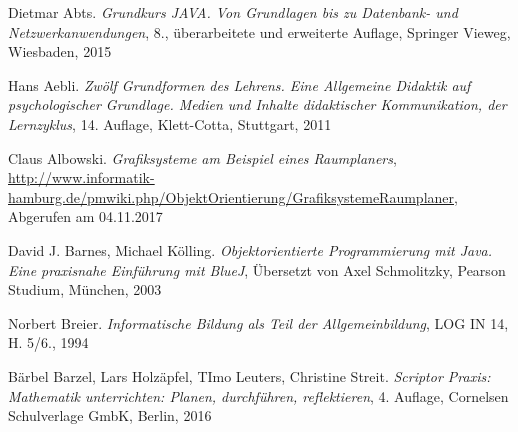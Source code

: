 \begin{thebibliography}{ABCDEF}

\renewcommand{\refname}{\normalsize Literaturverzeichnis}


Dietmar Abts. \emph{Grundkurs JAVA. Von Grundlagen bis zu Datenbank- und Netzwerkanwendungen}, 8., überarbeitete und erweiterte Auflage, Springer Vieweg, Wiesbaden, 2015

Hans Aebli. \emph{Zwölf Grundformen des Lehrens. Eine Allgemeine Didaktik auf psychologischer Grundlage. Medien und Inhalte didaktischer Kommunikation, der Lernzyklus}, 14. Auflage, Klett-Cotta, Stuttgart, 2011

Claus Albowski. \emph{Grafiksysteme am Beispiel eines Raumplaners}, \url{http://www.informatik-hamburg.de/pmwiki.php/ObjektOrientierung/GrafiksystemeRaumplaner}, Abgerufen am 04.11.2017

David J. Barnes, Michael Kölling. \emph{Objektorientierte Programmierung mit Java. Eine praxisnahe Einführung mit BlueJ}, Übersetzt von Axel Schmolitzky, Pearson Studium, München, 2003

Norbert Breier. \emph{Informatische Bildung als Teil der Allgemeinbildung}, LOG IN 14, H. 5/6., 1994

Bärbel Barzel, Lars Holzäpfel, TImo Leuters, Christine Streit. \emph{Scriptor Praxis: Mathematik unterrichten: Planen, durchführen, reflektieren}, 4. Auflage, Cornelsen Schulverlage GmbK, Berlin, 2016





\end{thebibliography}
